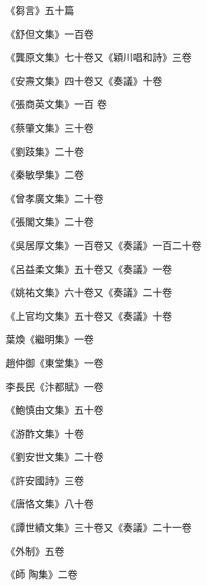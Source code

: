 \begin{pinyinscope}
 《芻言》五十篇



 《舒但文集》一百卷



 《龔原文集》七十卷又《穎川唱和詩》三卷



 《安燾文集》四十卷又《奏議》十卷



 《張商英文集》一百
 卷



 《蔡肇文集》三十卷



 《劉跂集》二十卷



 《秦敏學集》二卷



 《曾孝廣文集》二十卷



 《張閣文集》二十卷



 《吳居厚文集》一百卷又《奏議》一百二十卷



 《呂益柔文集》五十卷又《奏議》一卷



 《姚祐文集》六十卷又《奏議》二十卷



 《上官均文集》五十卷又《奏議》十卷



 葉煥《繼明集》一卷



 趙仲御《東堂集》一卷



 李長民《汴都賦》一卷



 《鮑慎由文集》五十卷



 《游酢文集》十卷



 《劉安世文集》二十卷



 《許安國詩》三卷



 《唐恪文集》八十卷



 《譚世績文集》三十卷又《奏議》二十一卷



 《外制》五卷



 《師
 陶集》二卷




\end{pinyinscope}
